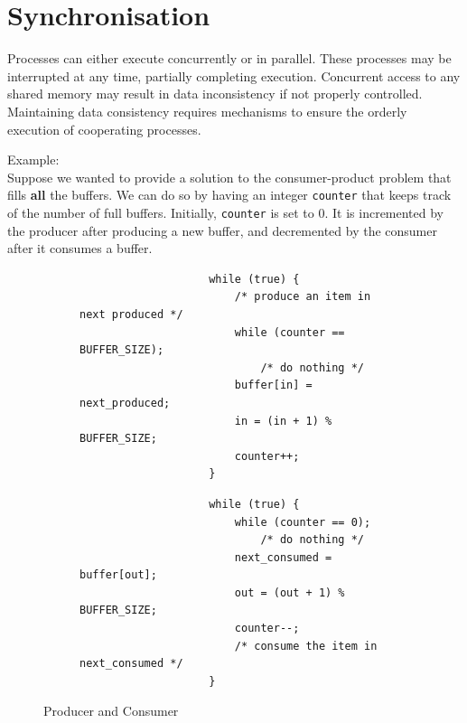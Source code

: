 \documentclass{book/custombook}
\begin{document}
    \chapter{Synchronisation}
        Processes can either execute concurrently or in parallel. These processes may be 
        interrupted at any time, partially completing execution.
        Concurrent access to any shared memory may result in data inconsistency if not properly
        controlled.\\
        Maintaining data consistency requires mechanisms to ensure the orderly execution of 
        cooperating processes.

        \hangindent=1cm Example: \\Suppose we wanted to provide a solution to the consumer-product problem that
        fills \textbf{all} the buffers. We can do so by having an integer \texttt{counter} that keeps
        track of the number of full buffers. Initially, \texttt{counter} is set to 0. It is incremented
        by the producer after producing a new buffer, and decremented by the consumer after it consumes
        a buffer.
        \begin{figure}[H]
            \centering
            \begin{subfigure}{0.5\textwidth}
                \begin{verbatim}
                    while (true) {
                        /* produce an item in next produced */
                        while (counter == BUFFER_SIZE);
                            /* do nothing */
                        buffer[in] = next_produced;
                        in = (in + 1) % BUFFER_SIZE;
                        counter++;
                    }
                \end{verbatim}
            \end{subfigure}
            \begin{subfigure}{0.49\textwidth}
                \begin{verbatim}
                    while (true) {
                        while (counter == 0);
                            /* do nothing */
                        next_consumed = buffer[out];
                        out = (out + 1) % BUFFER_SIZE;
                        counter--;
                        /* consume the item in next_consumed */
                    }
                \end{verbatim}
            \end{subfigure}
            \caption{Producer and Consumer}
        \end{figure}
\end{document}
